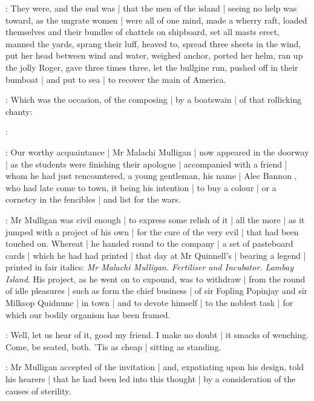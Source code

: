 \stephen:
They were,
and the end was |
that the men of the island |
seeing no help was toward,
as the ungrate women |
were all of one mind,
made a wherry raft,
loaded themselves and their bundles of chattels on shipboard,
set all masts erect,
manned the yards,
sprang their luff,
heaved to,
spread three sheets in the wind,
put her head between wind and water,
weighed anchor,
ported her helm,
ran up the jolly Roger,
gave three times three,
let the bullgine run,
pushed off in their bumboat |
and put to sea |
to recover the main of America.

\lynch:
Which was the occasion,
of the composing |
by a boatswain |
of that rollicking chanty:

\lynch:
%




:
Our worthy acquaintance |
Mr Malachi Mulligan  |
now appeared in the doorway |
as the students were finishing their apologue |
accompanied with a friend |
whom he had just rencountered,
a young gentleman,
his name |
Alec Bannon ,
who had late come to town,
it being his intention |
to buy a colour |
or a cornetcy in the fencibles |
and list for the wars.

:
Mr Mulligan was civil enough |
to express some relish of it |
all the more |
as it jumped with a project of his own |
for the cure of the very evil |
that had been touched on.
Whereat |
he handed round to the company |
a set of pasteboard cards |
which he had had printed |
that day at Mr Quinnell's |
bearing a legend |
printed in fair italics:
\emph{Mr Malachi Mulligan.
Fertiliser and Incubator.
Lambay Island}.
His project,
as he went on to expound,
was to withdraw |
from the round of idle pleasures |
such as form the chief business |
of sir Fopling Popinjay and sir Milksop Quidnunc |
in town |
and to devote himself |
to the noblest task |
for which our bodily organism has been framed.

\dixon:
Well,
let us hear of it,
good my friend.
I make no doubt |
it smacks of wenching.
Come,
be seated,
both.
'Tis as cheap |
sitting as standing.

:
Mr Mulligan accepted of the invitation |
and,
expatiating upon his design,
told his hearers |
that he had been led into this thought |
by a consideration of the causes of sterility.


